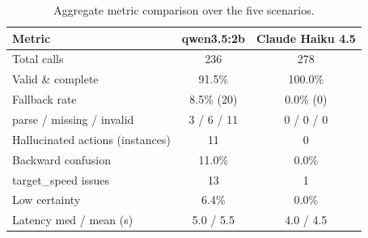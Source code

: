 \begin{table}[ht]
\centering
\caption{Aggregate metric comparison over the five scenarios.}
\label{tab:aggregate}
\begin{tabular}{lcc}
\toprule
Metric & qwen3.5:2b & Claude Haiku 4.5 \\
\midrule
Total calls & 236 & 278 \\
Valid \& complete & 91.5\% & 100.0\% \\
Fallback rate & 8.5\% (20) & 0.0\% (0) \\
\quad parse / missing / invalid & 3 / 6 / 11 & 0 / 0 / 0 \\
Hallucinated actions (instances) & 11 & 0 \\
Backward confusion & 11.0\% & 0.0\% \\
target\_speed issues & 13 & 1 \\
Low certainty & 6.4\% & 0.0\% \\
Latency med / mean (s) & 5.0 / 5.5 & 4.0 / 4.5 \\
\bottomrule
\end{tabular}
\end{table}

\begin{table}[ht]
\centering
\caption{Decision quality per scenario and model (qwen3.5:2b vs Claude Haiku 4.5).}
\label{tab:results-scenario}
\end{table}

